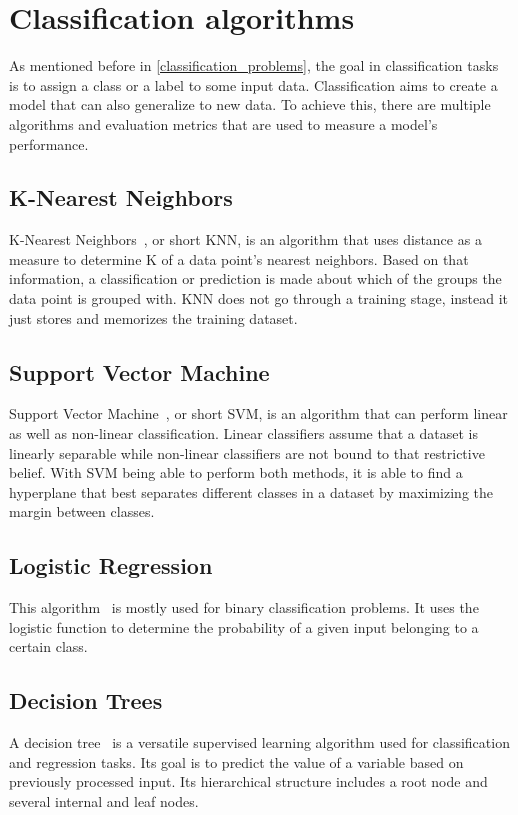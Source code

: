 \section{Classification algorithms} \label{classification}
As mentioned before in \ref{classification_problems}, the goal in classification tasks~\cite{classification_regression} is to assign a class or a label to some input data. Classification aims to create a model that can also generalize to new data. To achieve this, there are multiple algorithms and evaluation metrics that are used to measure a model's performance.

\subsection{K-Nearest Neighbors}
K-Nearest Neighbors~\cite{knn}, or short KNN, is an algorithm that uses distance as a measure to determine K of a data point's nearest neighbors. Based on that information, a classification or prediction is made about which of the groups the data point is grouped with. KNN does not go through a training stage, instead it just stores and memorizes the training dataset.

\subsection{Support Vector Machine}
Support Vector Machine~\cite{svm}, or short SVM, is an algorithm that can perform linear as well as non-linear classification. Linear classifiers assume that a dataset is linearly separable while non-linear classifiers are not bound to that restrictive belief. With SVM being able to perform both methods, it is able to find a hyperplane that best separates different classes in a dataset by maximizing the margin between classes. 

\subsection{Logistic Regression}
This algorithm~\cite{logistic_regression} is mostly used for binary classification problems. It uses the logistic function to determine the probability of a given input belonging to a certain class.

\subsection{Decision Trees}
A decision tree~\cite{decisiontrees} is a versatile supervised learning algorithm used for classification and regression tasks. Its goal is to predict the value of a variable based on previously processed input. Its hierarchical structure includes a root node and several internal and leaf nodes.

